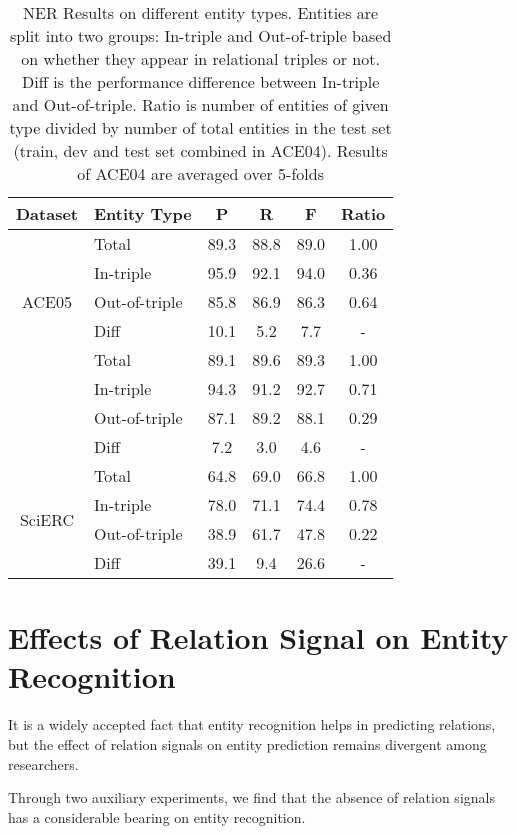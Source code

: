\documentclass[11pt]{article}
\begin{document}
\begin{table}[!t]
\small
\centering
\begin{spacing}{1.19}
\begin{threeparttable}
\begin{tabular}{c|lcccc}
\bottomrule
\textbf{Dataset} & \textbf{Entity Type} & P & R & F & Ratio\\
\hline
\multirow{5}{*}{ACE05} 
& Total & 89.3 & 88.8 & 89.0 & 1.00\\ 
& In-triple & 95.9 & 92.1 & 94.0 & 0.36\\
& Out-of-triple & 85.8 & 86.9 & 86.3 & 0.64\\
& Diff & 10.1 & 5.2 & 7.7 & -\\
\hline
\multirow{5}{*}{ACE04} 
& Total & 89.1 & 89.6 & 89.3 & 1.00 \\ 
& In-triple & 94.3 & 91.2 & 92.7 & 0.71 \\
& Out-of-triple & 87.1 & 89.2 & 88.1 & 0.29\\
& Diff & 7.2 & 3.0 & 4.6 & - \\
\hline
\multirow{5}{*}{SciERC} 
& Total & 64.8 & 69.0 & 66.8 & 1.00\\ 
& In-triple & 78.0 & 71.1 & 74.4 & 0.78\\
& Out-of-triple & 38.9 & 61.7 & 47.8 & 0.22\\
& Diff & 39.1 & 9.4 & 26.6 & -\\
\toprule
\end{tabular} 
\end{threeparttable}
\end{spacing}
\caption{NER Results on different entity types. Entities are split into two groups: In-triple and Out-of-triple based on whether they appear in relational triples or not. Diff is the performance difference between In-triple and Out-of-triple. Ratio is number of entities of given type divided by number of total entities in the test set (train, dev and test set combined in ACE04). Results of ACE04 are averaged over 5-folds}
\label{tab:my-table4}
\end{table}

\section{Effects of Relation Signal on Entity Recognition}
It is a widely accepted fact that entity recognition helps in predicting relations, but the effect of relation signals on entity prediction remains divergent among researchers.

Through two auxiliary experiments, we find that the absence of relation signals has a considerable bearing on entity recognition.
\end{document}
